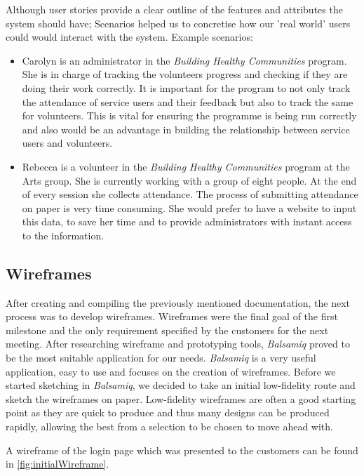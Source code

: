 \documentclass{l3proj}
\begin{document}
Although user stories provide a clear outline of the features and attributes the system should have; Scenarios helped us to concretise how our 'real world' users could would interact with the system.
Example scenarios:
\begin{itemize}
\item Carolyn is an administrator in the \textit{Building Healthy Communities} program. She is in charge of tracking the volunteers progress and checking if they are doing their work correctly. It is important for the program to not only track the attendance of service users and their feedback but also to track the same for volunteers. This is vital for ensuring the programme is being run correctly and also would be an advantage in building the relationship between service users and volunteers.

\item Rebecca is a volunteer in the \textit{Building Healthy Communities} program at the Arts group. She is currently working with a group of eight people. At the end of every session she collects attendance. The process of submitting attendance on paper is very time consuming. She would prefer to have a website to input this data, to save her time and to provide administrators with instant access to the information.

\end{itemize}

\subsection{Wireframes}
\label{wireframes}

After creating and compiling the previously mentioned documentation, the next process was to develop wireframes. Wireframes were the final goal of the first milestone and the only requirement specified by the customers for the next meeting. After researching wireframe and prototyping tools, \textit{Balsamiq} proved to be the most suitable application for our needs. \textit{Balsamiq} is a very useful application, easy to use and focuses on the creation of wireframes. Before we started sketching in \textit{Balsamiq}, we decided to take an initial low-fidelity route and sketch the wireframes on paper. Low-fidelity wireframes are often a good starting point as they are quick to produce and thus many designs can be produced rapidly, allowing the best from a selection to be chosen to move ahead with.

A wireframe of the login page which was presented to the customers can be found in \autoref{fig:initialWireframe}.
\end{document}
